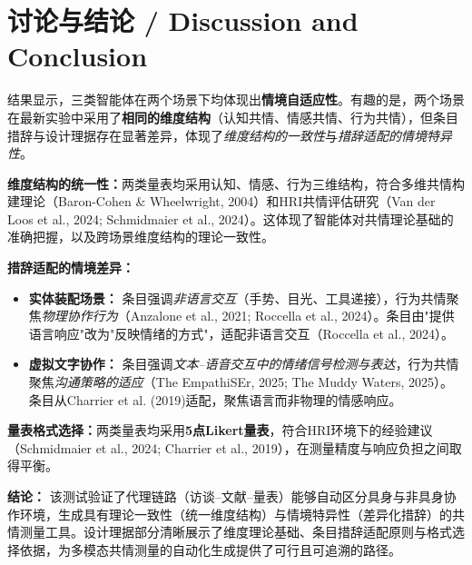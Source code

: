 \documentclass[12pt,a4paper]{article}
\begin{document}
\section{讨论与结论 / Discussion and Conclusion}

结果显示，三类智能体在两个场景下均体现出\textbf{情境自适应性}。有趣的是，两个场景在最新实验中采用了\textbf{相同的维度结构}（认知共情、情感共情、行为共情），但条目措辞与设计理据存在显著差异，体现了\textit{维度结构的一致性}与\textit{措辞适配的情境特异性}。

\textbf{维度结构的统一性：}两类量表均采用认知、情感、行为三维结构，符合多维共情构建理论（Baron-Cohen \& Wheelwright, 2004）和HRI共情评估研究（Van der Loos et al., 2024; Schmidmaier et al., 2024）。这体现了智能体对共情理论基础的准确把握，以及跨场景维度结构的理论一致性。

\textbf{措辞适配的情境差异：}
\begin{itemize}
  \item \textbf{实体装配场景：} 条目强调\textit{非语言交互}（手势、目光、工具递接），行为共情聚焦\textit{物理协作行为}（Anzalone et al., 2021; Roccella et al., 2024）。条目由"提供语言响应"改为"反映情绪的方式"，适配非语言交互（Roccella et al., 2024）。
  \item \textbf{虚拟文字协作：} 条目强调\textit{文本–语音交互中的情绪信号检测与表达}，行为共情聚焦\textit{沟通策略的适应}（The EmpathiSEr, 2025; The Muddy Waters, 2025）。条目从Charrier et al. (2019)适配，聚焦语言而非物理的情感响应。
\end{itemize}

\textbf{量表格式选择：}两类量表均采用\textbf{5点Likert量表}，符合HRI环境下的经验建议（Schmidmaier et al., 2024; Charrier et al., 2019），在测量精度与响应负担之间取得平衡。

\noindent\textbf{结论：} 该测试验证了代理链路（访谈–文献–量表）能够自动区分具身与非具身协作环境，生成具有理论一致性（统一维度结构）与情境特异性（差异化措辞）的共情测量工具。设计理据部分清晰展示了维度理论基础、条目措辞适配原则与格式选择依据，为多模态共情测量的自动化生成提供了可行且可追溯的路径。
\end{document}
